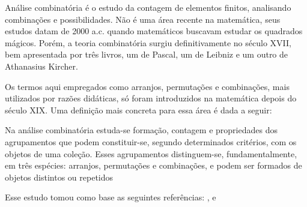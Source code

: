 Análise combinatória é o estudo da contagem de elementos finitos, analisando combinações e possibilidades. Não é uma área recente na matemática, seus estudos datam de 2000 a.c. quando matemáticos buscavam estudar os quadrados mágicos. Porém, a teoria combinatória surgiu definitivamente no século XVII, bem apresentada por três livros, um de Pascal, um de Leibniz e um outro de Athanasius Kircher.

Os termos aqui empregados como arranjos, permutações e combinações, mais utilizados por razões didáticas, só foram introduzidos na matemática depois do século XIX. Uma definição mais concreta para essa área é dada a seguir:

\begin{citacao}
	Na  análise  combinatória  estuda-se  formação,  contagem  e  propriedades  dos  
	agrupamentos que podem constituir-se, segundo determinados critérios, com os objetos 
	de   uma   coleção.   Esses   agrupamentos   distinguem-se,   fundamentalmente,   em   três   
	espécies: 
	arranjos,  permutações  e  combinações,
	e  podem  ser  formados  de  objetos  
	distintos ou repetidos \cite[p.5]{vazquez2004analise}
\end{citacao}

Esse estudo tomou como base as seguintes referências: ,  e 



